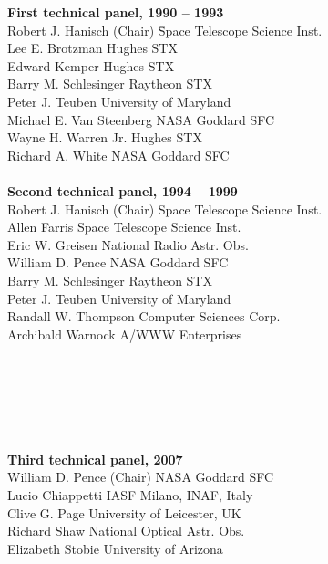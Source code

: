 \documentclass[onecolumn]{aa}
\begin{document}
\begin{tabbing}
{\bf First technical panel, 1990 -- 1993} \\ 
Robert J. Hanisch (Chair)  \=  Space Telescope Science Inst.\\
Lee E. Brotzman  \>  Hughes STX \\
Edward Kemper  \> Hughes STX \\
Barry M. Schlesinger   \> Raytheon STX \\
Peter J. Teuben  \> University of Maryland \\
Michael E. Van Steenberg  \> NASA Goddard SFC \\
Wayne H. Warren Jr.  \>  Hughes STX \\
Richard A. White \>  NASA Goddard SFC \\
\\
{\bf Second technical panel, 1994 -- 1999} \\ 
Robert J. Hanisch (Chair)  \>  Space Telescope Science Inst.\\
Allen Farris   \> Space Telescope Science Inst. \\
Eric W. Greisen  \> National Radio Astr. Obs. \\
William D. Pence   \> NASA Goddard SFC \\
Barry M. Schlesinger    \> Raytheon STX \\
Peter J. Teuben  \> University of Maryland \\
Randall W. Thompson  \> Computer Sciences Corp. \\
Archibald Warnock   \> A/WWW Enterprises \\
\\
\\
\\
\\
\\
\\
{\bf Third technical panel, 2007} \\ 
William D. Pence (Chair)  \> NASA Goddard SFC \\
Lucio Chiappetti  \> IASF Milano, INAF, Italy \\
Clive G. Page  \> University of Leicester, UK \\
Richard Shaw  \> National Optical Astr. Obs. \\
Elizabeth Stobie  \> University of Arizona \\	     
\end{tabbing}




\ifiaufwgstyle
\clearpage
\fi
\end{document}

